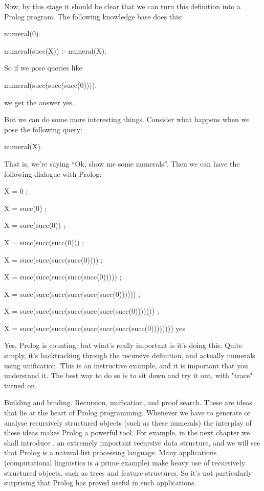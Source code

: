 Now, by this stage it should be clear that we can turn this
definition into a Prolog program.  The following knowledge base does
this:
\begin{LPNcodedisplay}
numeral(0).

numeral(succ(X)) :- numeral(X).
\end{LPNcodedisplay}
So if we pose queries like
\begin{LPNcodedisplay}
numeral(succ(succ(succ(0)))).
\end{LPNcodedisplay}
we get the answer yes.

But we can do some more interesting things.  Consider what happens when
we pose the following query:
\begin{LPNcodedisplay}
numeral(X).
\end{LPNcodedisplay}
That is, we're saying ``Ok, show me some numerals''.  Then we can have
the following dialogue with Prolog:
\begin{LPNcodedisplay}
X = 0 ;

X = succ(0) ;

X = succ(succ(0)) ;

X = succ(succ(succ(0))) ;

X = succ(succ(succ(succ(0)))) ;

X = succ(succ(succ(succ(succ(0))))) ;

X = succ(succ(succ(succ(succ(succ(0)))))) ;

X = succ(succ(succ(succ(succ(succ(succ(0))))))) ;

X = succ(succ(succ(succ(succ(succ(succ(succ(0))))))))
yes
\end{LPNcodedisplay}


Yes, Prolog is counting: but what's really important is  it's
doing this. Quite simply, it's backtracking through the recursive
definition, and actually  numerals using unification. This
is an instructive example, and it is important that you understand
it. The best way to do so is to sit down and try it out, with
"trace" turned on.

Building and binding.  Recursion, unification, and proof search.  These
are ideas that lie at the heart of Prolog programming.  Whenever we
have to generate or analyse recursively structured objects (such as
these numerals) the interplay of these ideas makes Prolog a powerful
tool.  For example, in the next chapter we shall introduce
, an extremely important recursive data structure, and
we will see that Prolog is a natural list processing language.  Many
applications (computational linguistics is a prime example) make heavy
use of recursively structured objects, such as trees and feature
structures.  So it's not particularly surprising that Prolog has
proved useful in such applications.

